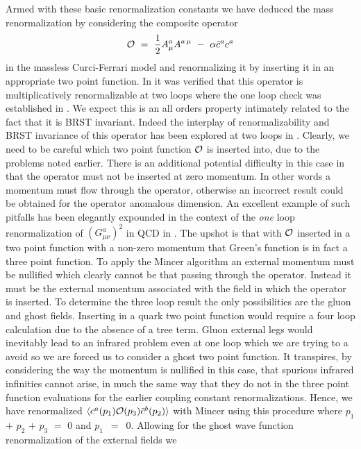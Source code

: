 \documentclass[a4paper,11pt]{article}
\begin{document}
Armed with these basic renormalization constants we have deduced the mass
renormalization by considering the composite operator 
\begin{equation} 
{\cal O} ~=~ \frac{1}{2} A^a_\mu A^{a \, \mu} ~-~ \alpha \bar{c}^a c^a
\end{equation} 
in the massless Curci-Ferrari model and renormalizing it by inserting it in an
appropriate two point function. In \cite{44} it was verified that this operator
is multiplicatively renormalizable at two loops where the one loop check was
established in \cite{5}. We expect this is an all orders property intimately 
related to the fact that it is BRST invariant. Indeed the interplay of 
renormalizability and BRST invariance of this operator has been explored at 
two loops in \cite{44}. Clearly, we need to be careful which two point function 
${\cal O}$ is inserted into, due to the problems noted earlier. There is an 
additional potential difficulty in this case in that the operator must not be 
inserted at zero momentum. In other words a momentum must flow through the 
operator, otherwise an incorrect result could be obtained for the operator
anomalous dimension. An excellent example of such pitfalls has been elegantly
expounded in the context of the {\em one} loop renormalization of
$(G^a_{\mu\nu})^2$ in QCD in \cite{45}. The upshot is that with ${\cal O}$
inserted in a two point function with a non-zero momentum that Green's function
is in fact a three point function. To apply the {\sc Mincer} algorithm an 
external momentum must be nullified which clearly cannot be that passing 
through the operator. Instead it must be the external momentum associated with 
the field in which the operator is inserted. To determine the three loop result
the only possibilities are the gluon and ghost fields. Inserting in a quark two
point function would require a four loop calculation due to the absence of a 
tree term. Gluon external legs would inevitably lead to an infrared problem 
even at one loop which we are trying to a avoid so we are forced us to consider
a ghost two point function. It transpires, by considering the way the momentum 
is nullified in this case, that spurious infrared infinities cannot arise, in 
much the same way that they do not in the three point function evaluations for 
the earlier coupling constant renormalizations. Hence, we have renormalized 
$\langle c^a(p_1) {\cal O}(p_3) \bar{c}^b(p_2) \rangle$ with {\sc Mincer} using
this procedure where $p_1$ $+$ $p_2$ $+$ $p_3$ $=$ $0$ and $p_1$~$=$~$0$. 
Allowing for the ghost wave function renormalization of the external fields we 
\end{document}
